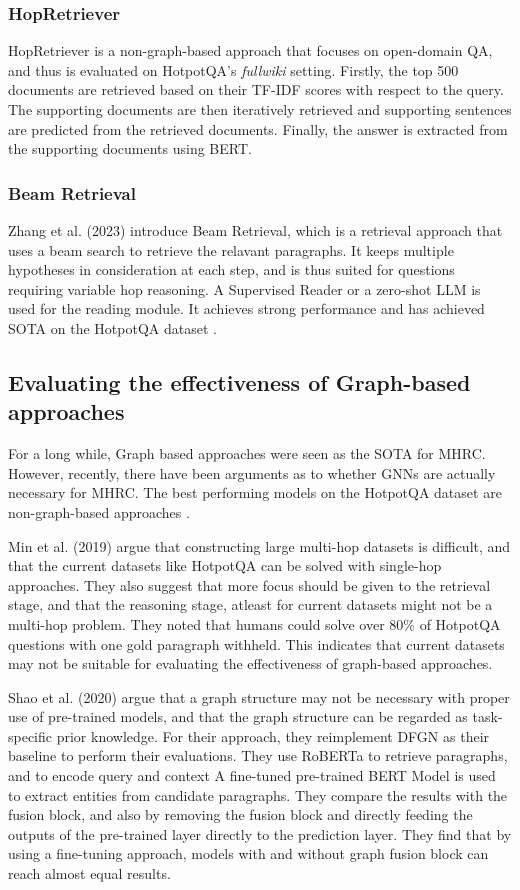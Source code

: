 \documentclass[sigplan,screen]{acmart}
\begin{document}
\subsubsection{HopRetriever}
HopRetriever \cite{RN149} is a non-graph-based approach that focuses on open-domain QA, and thus is evaluated on HotpotQA's \emph{fullwiki} setting.
Firstly, the top 500 documents are retrieved based on their TF-IDF scores with respect to the query. The supporting documents
are then iteratively retrieved and supporting sentences are predicted from the retrieved documents. Finally, the answer is extracted 
from the supporting documents using BERT.

\subsubsection{Beam Retrieval}
 Zhang et al. (2023)\cite{RN105} introduce Beam Retrieval, which is a retrieval approach that uses a beam search to retrieve the relavant paragraphs. It keeps multiple 
hypotheses in consideration at each step, and is thus suited for questions requiring variable hop reasoning. A Supervised Reader or a zero-shot LLM is used 
for the reading module. It achieves strong performance and has achieved SOTA on the HotpotQA dataset \cite{RN116}.


\subsection{Evaluating the effectiveness of Graph-based approaches}

For a long while, Graph based approaches were seen as the SOTA for MHRC. However, recently, there have been arguments as to whether GNNs are actually necessary for MHRC. The best performing models 
on the HotpotQA dataset \cite{RN116} are non-graph-based approaches \cite{RN105} \cite{RN149}. 

Min et al. (2019) \cite{RN150} argue that constructing large multi-hop datasets is difficult, and that the current datasets like HotpotQA can be solved with single-hop approaches.
They also suggest that more focus should be given to the retrieval stage, and that the reasoning stage, atleast for current datasets might not be a multi-hop problem. They noted that
humans could solve over 80\% of HotpotQA questions with one gold paragraph withheld. This indicates that current datasets may not be suitable for evaluating the effectiveness of 
graph-based approaches.

Shao et al. (2020) \cite{RN127} argue that a graph structure may not be necessary with proper use of 
pre-trained models, and that the graph structure can be regarded as task-specific prior knowledge. For their approach,
they reimplement DFGN \cite{RN122} as their baseline to perform their evaluations. They use RoBERTa \cite{RN171} to retrieve paragraphs, and to encode query and context 
A fine-tuned pre-trained BERT Model is used to extract entities from candidate paragraphs. They compare the results with the fusion block, and also by removing the fusion block and directly feeding the 
outputs of the pre-trained layer directly to the prediction layer. They find that by using a fine-tuning approach, models with and without graph fusion block can reach almost equal results.
\end{document}
